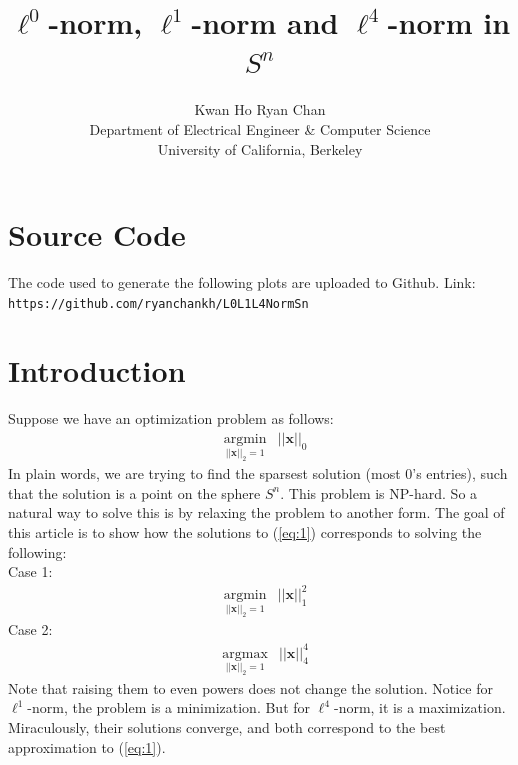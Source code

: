 \documentclass[11pt]{article}
\begin{document}
\title{$\ell^0$-norm, $\ell^1$-norm and $\ell^4$-norm in $S^n$}
\author{Kwan Ho Ryan Chan\\Department of Electrical Engineer \& Computer Science\\University of California, Berkeley}
\maketitle

\section*{Source Code}
	The code used to generate the following plots are uploaded to Github. Link: \texttt{https://github.com/ryanchankh/L0L1L4NormSn}
\section{Introduction}
Suppose we have an optimization problem as follows:
\begin{equation}
\begin{aligned}
     & \underset{||\bm{x}||_2=1}{\text{argmin}} & ||\bm{x}||_0  \label{eq:1}
\end{aligned}
\end{equation}
In plain words, we are trying to find the sparsest solution (most 0's entries), such that the solution
is a point on the sphere $S^n$. This problem is NP-hard. So a natural way to solve this is by relaxing the problem to another form. The goal of this article is to show how the solutions to (\ref{eq:1}) corresponds to solving the following: \\
Case 1:
\begin{equation}
\begin{aligned}
     & \underset{||\bm{x}||_2=1}{\text{argmin}} & ||\bm{x}||_1^2  \label{eq:2}
\end{aligned}
\end{equation}
Case 2:  
\begin{equation}
\begin{aligned}
     & \underset{||\bm{x}||_2=1}{\text{argmax}} & ||\bm{x}||_4^4  \label{eq:3}
\end{aligned}
\end{equation}
Note that raising them to even powers does not change the solution. Notice for $\ell^1$-norm, the problem is a minimization. But for $\ell^4$-norm, it is a maximization. Miraculously, their solutions converge, and both correspond to the best approximation to (\ref{eq:1}).  
\end{document}
